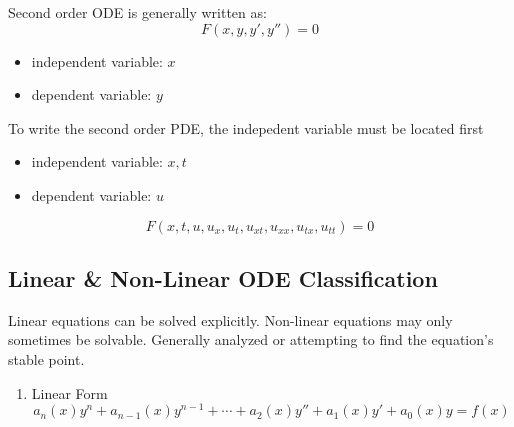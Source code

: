 \documentclass{article}
\begin{document}
Second order ODE is generally written as:
$$ F \left( x, y, y', y'' \right) = 0 $$
\begin{itemize}
    \item independent variable: $x$
    \item dependent variable: $y$
\end{itemize}

To write the second order PDE, the indepedent variable must be located first
\begin{itemize}
    \item independent variable: $x, t$
    \item dependent variable: $u$
\end{itemize}
$$ F \left( x, t, u, u_{x}, u_{t}, u_{xt}, u_{xx}, u_{tx}, u_{tt} \right) = 0 $$

\subsection{Linear \& Non-Linear ODE Classification}

Linear equations can be solved explicitly.
Non-linear equations may only sometimes be solvable. Generally analyzed or attempting to find the equation's stable point.

\begin{enumerate}
    \item Linear Form
    $$ a_{n}(x) y^{n} + a_{n - 1}(x) y^{n-1} + \cdots + a_{2}(x) y'' + a_{1}(x) y' + a_{0}(x) y = f(x) $$
\end{enumerate}
\end{document}
